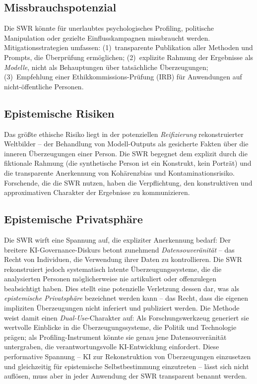 \documentclass[11pt,a4paper]{article}
\theoremstyle{definition}
\theoremstyle{plain}
\theoremstyle{remark}
\begin{document}
\subsection{Missbrauchspotenzial}

Die SWR k\"onnte f\"ur unerlaubtes psychologisches Profiling, politische Manipulation oder gezielte Einflusskampagnen missbraucht werden. Mitigationsstrategien umfassen: (1)~transparente Publikation aller Methoden und Prompts, die \"Uberpr\"ufung erm\"oglichen; (2)~explizite Rahmung der Ergebnisse als \emph{Modelle}, nicht als Behauptungen \"uber tats\"achliche \"Uberzeugungen; (3)~Empfehlung einer Ethikkommissions-Pr\"ufung (IRB) f\"ur Anwendungen auf nicht-\"offentliche Personen.

\subsection{Epistemische Risiken}

Das gr\"o\ss{}te ethische Risiko liegt in der potenziellen \emph{Reifizierung} rekonstruierter Weltbilder -- der Behandlung von Modell-Outputs als gesicherte Fakten \"uber die inneren \"Uberzeugungen einer Person. Die SWR begegnet dem explizit durch die fiktionale Rahmung (die synthetische Person ist ein Konstrukt, kein Portr\"at) und die transparente Anerkennung von Koh\"arenzbias und Kontaminationsrisiko. Forschende, die die SWR nutzen, haben die Verpflichtung, den konstruktiven und approximativen Charakter der Ergebnisse zu kommunizieren.

\subsection{Epistemische Privatsph\"are}

Die SWR wirft eine Spannung auf, die expliziter Anerkennung bedarf: Der breitere KI-Governance-Diskurs betont zunehmend \emph{Datensouver\"anit\"at} -- das Recht von Individuen, die Verwendung ihrer Daten zu kontrollieren. Die SWR rekonstruiert jedoch systematisch latente \"Uberzeugungssysteme, die die analysierten Personen m\"oglicherweise nie artikuliert oder offenzulegen beabsichtigt haben. Dies stellt eine potenzielle Verletzung dessen dar, was als \emph{epistemische Privatsph\"are} bezeichnet werden kann -- das Recht, dass die eigenen impliziten \"Uberzeugungen nicht inferiert und publiziert werden. Die Methode weist damit einen \emph{Dual-Use}-Charakter auf: Als Forschungswerkzeug generiert sie wertvolle Einblicke in die \"Uberzeugungssysteme, die Politik und Technologie pr\"agen; als Profiling-Instrument k\"onnte sie genau jene Datensouver\"anit\"at untergraben, die verantwortungsvolle KI-Entwicklung einfordert. Diese performative Spannung -- KI zur Rekonstruktion von \"Uberzeugungen einzusetzen und gleichzeitig f\"ur epistemische Selbstbestimmung einzutreten -- l\"asst sich nicht aufl\"osen, muss aber in jeder Anwendung der SWR transparent benannt werden.
\end{document}
